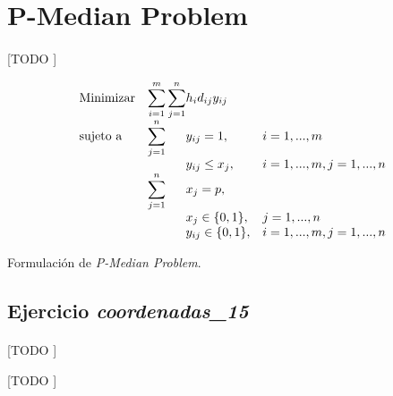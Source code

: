 \documentclass[spanish]{article}
\begin{document}
	\section{P-Median Problem}
	\label{sec:e-8}

		\paragraph{}
		[TODO ]


		\begin{eqfloat}
			\begin{equation}
				\begin{array}{ll@{}ll}
					\text{Minimizar}
						& \displaystyle\sum\limits_{i = 1}^m
							\displaystyle\sum\limits_{j = 1}^n	& h_i d_{ij} y_{ij}	&							\\
					\text{sujeto a}
						& \displaystyle\sum\limits_{j = 1}^n 	& y_{ij} = 1,		& i = 1,..., m	\\
						& 																	 	& y_{ij} \leq x_{j},  		& i=1 ,..., m,j=1 ,..., n  \\
						& \displaystyle\sum\limits_{j = 1}^n 	& x_{j} = p,  		& 						\\
						&                                     &	x_{j} \in \{0,1\},&j=1 ,..., n 	\\
						&                                     &	y_{ij} \in \{0,1\},&i=1 ,..., m, j=1 ,..., n  \\
				\end{array}
			\end{equation}
			\caption{Formulación de \emph{P-Median Problem}.}
      \label{eq:p_median}
    \end{eqfloat}


		\subsection{Ejercicio \emph{coordenadas\_15}}
		\label{sec:e-8a}

			\paragraph{}
			[TODO ]

			\begin{table}[p]
				\begin{center}
				\end{center}
				\caption{[TODO ]}
				\label{}
			\end{table}
\end{document}

